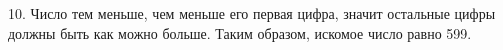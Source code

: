 10. Число тем меньше, чем меньше его первая цифра, значит остальные цифры должны быть как можно больше. Таким образом, искомое число равно 599.\\
